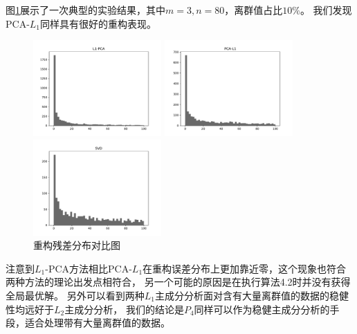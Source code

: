 图\ref{compare-con-error}展示了一次典型的实验结果，其中$m = 3, n = 80$，离群值占比$10\%$。
我们发现PCA-$L_1$同样具有很好的重构表现。

\begin{figure}[H]
    \centering
    \begin{minipage}[t]{0.3\textwidth}
    \includegraphics[width=4.9cm]{pics/lab1/l1-pca.pdf}
    \end{minipage}
    \begin{minipage}[t]{0.3\textwidth}
    \includegraphics[width=4.9cm]{pics/lab1/pca-l1.pdf}
    \end{minipage}
    \begin{minipage}[t]{0.3\textwidth}
    \includegraphics[width=4.9cm]{pics/lab1/svd.pdf}
    \end{minipage}
    \caption{重构残差分布对比图}
    \label{compare-con-error}
\end{figure}

注意到$L_1$-PCA方法相比PCA-$L_1$在重构误差分布上更加靠近零，这个现象也符合两种方法的理论出发点相符合，
另一个可能的原因是在执行算法4.2时并没有获得全局最优解。
另外可以看到两种$L_1$主成分分析面对含有大量离群值的数据的稳健性均远好于$L_2$主成分分析，
我们的结论是$P_4$同样可以作为稳健主成分分析的手段，适合处理带有大量离群值的数据。

